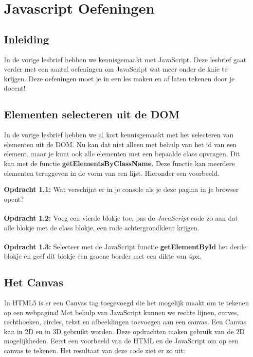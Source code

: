 \documentclass[a4paper]{report}
\begin{document}
\chapter*{\textcolor{seccol}{Javascript} Oefeningen}

\section*{Inleiding}
In de vorige lesbrief hebben we kennisgemaakt met JavaScript. Deze lesbrief gaat verder met een aantal oefeningen om JavaScript wat meer onder de knie te krijgen. Deze oefeningen moet je in een les maken en af laten tekenen door je docent!

\section*{Elementen selecteren uit de DOM}
In de vorige lesbrief hebben we al kort kennisgemaakt met het selecteren van elementen uit de DOM. Nu kan dat niet alleen met behulp van het id van een element, maar je kunt ook alle elementen met een bepaalde class opvragen. Dit kan met de functie \textbf{getElementsByClassName}. Deze functie kan meerdere elementen teruggeven in de vorm van een lijst. Hieronder een voorbeeld. 



\clearpage



\noindent \textbf{Opdracht 1.1:} Wat verschijnt er in je console als je deze pagina in je browser opent?
\\
\\
\noindent \textbf{Opdracht 1.2:} Voeg een vierde blokje toe, pas de \emph{JavaScript} code zo aan dat alle blokje met de class blokje, een rode achtergrondkleur krijgen.
\\
\\
\noindent \textbf{Opdracht 1.3:} Selecteer met de JavaScript functie \textbf{getElementById} het derde blokje en geef dit blokje een groene border met een dikte van 4px.

\section*{Het Canvas}
In HTML5 is er een Canvas tag toegevoegd die het mogelijk maakt om te tekenen op een webpagina! Met behulp van JavaScript kunnen we rechte lijnen, curves, rechthoeken, circles, tekst en afbeeldingen toevoegen aan een canvas. Een Canvas kan in 2D en in 3D gebruikt worden. Deze opdrachten maken gebruik van de 2D mogelijkheden. Eerst een voorbeeld van de HTML en de JavaScript om op een canvas te tekenen. Het resultaat van deze code ziet er zo uit:
\end{document}
